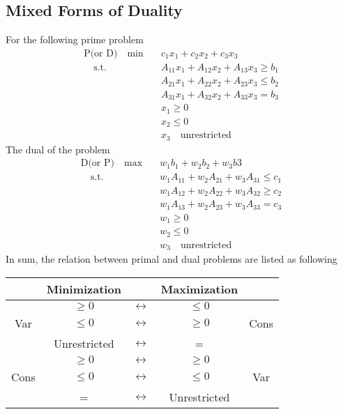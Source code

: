 				\subsection{Mixed Forms of Duality}
					For the following prime problem
					\begin{align}
						\text{P(or D)} \quad \min \quad & c_1x_1 + c_2x_2 + c_3x_3 \\
						\quad \text{s.t.} \quad & A_{11}x_1 + A_{12}x_2 + A_{13}x_3 \ge b_1 \\
												& A_{21}x_1 + A_{22}x_2 + A_{23}x_3 \le b_2 \\
												& A_{31}x_1 + A_{32}x_2 + A_{33}x_3 = b_3 \\
												& x_1 \ge 0 \\
												& x_2 \le 0 \\
												& x_3 \quad \text{unrestricted} 
					\end{align}
					The dual of the problem
					\begin{align}
						\text{D(or P)} \quad \max \quad & w_1b_1 + w_2b_2 + w_3b3 \\
						\quad \text{s.t.} \quad & w_1A_{11} + w_2A_{21} + w_3A_{31} \le c_1 \\
												& w_1A_{12} + w_2A_{22} + w_3A_{32} \ge c_2 \\
												& w_1A_{13} + w_2A_{23} + w_3A_{33} = c_3 \\
												& w_1 \ge 0 \\
												& w_2 \le 0 \\
												& w_3 \quad \text{unrestricted} 
					\end{align}
					In sum, the relation between primal and dual problems are listed as following\\
					\begin{tabular}{|c|c|c|c|c|}
						\hline & Minimization& & Maximization& \\
						\hline & $\geq 0$ & $\longleftrightarrow$ & $\leq 0$ & \\
						Var & $\leq 0$ & $\longleftrightarrow$ & $\geq 0$ & Cons \\
						& Unrestricted & $\longleftrightarrow$ & = & \\
						\hline & $\geq 0$ & $\longleftrightarrow$ & $\geq 0$ & \\
						Cons & $\leq 0$ & $\longleftrightarrow$ & $\leq 0$ & Var \\
						& = & $\longleftrightarrow$ & Unrestricted & \\
						\hline
					\end{tabular} 

